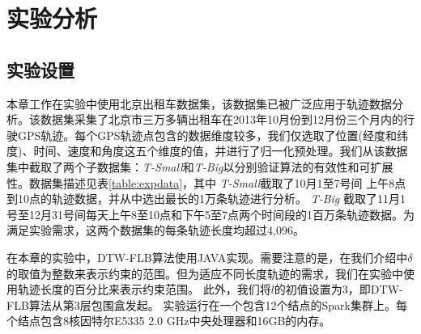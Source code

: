  
 
\section{实验分析}\label{sec-c5-Exp}
  \subsection{实验设置}
  本章工作在实验中使用北京出租车数据集，该数据集已被广泛应用于轨迹数据分析。该数据集采集了北京市三万多辆出租车在2013年10月份到12月份三个月内的行驶GPS轨迹。每个GPS轨迹点包含的数据维度较多，我们仅选取了位置(经度和纬度)、时间、速度和角度这五个维度的值，并进行了归一化预处理。我们从该数据集中截取了两个子数据集：\emph{T-Small}和\emph{T-Big}以分别验证算法的有效性和可扩展性。数据集描述见表\ref{table:expdata}，其中
  \emph{T-Small}截取了10月1至7号间 上午8点到10点的轨迹数据，并从中选出最长的1万条轨迹进行分析。
  \emph{T-Big} 截取了11月1号至12月31号间每天上午8至10点和下午5至7点两个时间段的1百万条轨迹数据。为满足实验需求，这两个数据集的每条轨迹长度均超过4,096。
  
  在本章的实验中，DTW-FLB算法使用JAVA实现。需要注意的是，在我们介绍中$\delta$的取值为整数来表示约束的范围。但为适应不同长度轨迹的需求，我们在实验中使用轨迹长度的百分比来表示约束范围。
  此外，我们将$l$的初值设置为3，即DTW-FLB算法从第$3$层包围盒发起。
  实验运行在一个包含12个结点的Spark集群上。每个结点包含8核因特尔E5335 2.0 GHz中央处理器和16GB的内存。
  
